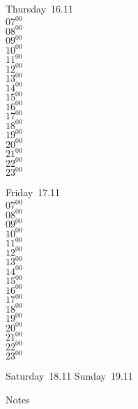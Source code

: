 \documentclass[11pt, a4paper]{book}\usepackage[]{graphicx}\usepackage[]{color}
\begin{document}
\begin{weekdaybox}
  Thursday~16.11\\
  { 
  \vfill
  $07^{00}$\\
$08^{00}$\\
$09^{00}$\\
$10^{00}$\\
$11^{00}$\\
$12^{00}$\\
$13^{00}$\\
$14^{00}$\\
$15^{00}$\\
$16^{00}$\\
$17^{00}$\\
$18^{00}$\\
$19^{00}$\\
$20^{00}$\\
$21^{00}$\\
$22^{00}$\\
$23^{00}$\\
  }
\end{weekdaybox} 
\begin{weekdaybox}
  Friday~17.11\\
  { 
  \vfill
  $07^{00}$\\
$08^{00}$\\
$09^{00}$\\
$10^{00}$\\
$11^{00}$\\
$12^{00}$\\
$13^{00}$\\
$14^{00}$\\
$15^{00}$\\
$16^{00}$\\
$17^{00}$\\
$18^{00}$\\
$19^{00}$\\
$20^{00}$\\
$21^{00}$\\
$22^{00}$\\
$23^{00}$\\
  }
\end{weekdaybox}
\begin{weekendbox}
  Saturday~18.11
  \tcblower
  Sunday~19.11
\end{weekendbox} %
\begin{notebox}
  Notes
\end{notebox}
\clearpage
\end{document}
